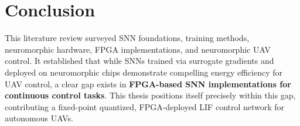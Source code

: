 \documentclass[12pt,a4paper]{article}
\begin{document}
\section{Conclusion}
This literature review surveyed SNN foundations, training methods, neuromorphic hardware, FPGA implementations, and neuromorphic UAV control. It established that while SNNs trained via surrogate gradients and deployed on neuromorphic chips demonstrate compelling energy efficiency for UAV control, a clear gap exists in \textbf{FPGA-based SNN implementations for continuous control tasks}. This thesis positions itself precisely within this gap, contributing a fixed-point quantized, FPGA-deployed LIF control network for autonomous UAVs.



\end{document}
